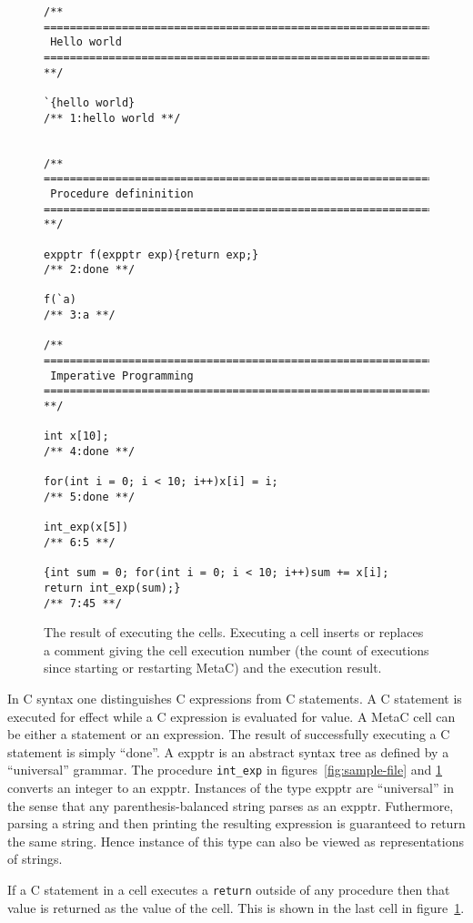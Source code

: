 \documentclass{article}
\begin{document}
\begin{figure}
 \begin{verbatim}
/** ========================================================================
 Hello world
======================================================================== **/

`{hello world}
/** 1:hello world **/


/** ========================================================================
 Procedure defininition
======================================================================== **/

expptr f(expptr exp){return exp;}
/** 2:done **/

f(`a)
/** 3:a **/

/** ========================================================================
 Imperative Programming
======================================================================== **/

int x[10];
/** 4:done **/

for(int i = 0; i < 10; i++)x[i] = i;
/** 5:done **/

int_exp(x[5])
/** 6:5 **/

{int sum = 0; for(int i = 0; i < 10; i++)sum += x[i]; return int_exp(sum);}
/** 7:45 **/
\end{verbatim}
\caption{The result of executing the cells.  Executing a cell inserts or replaces a comment
  giving the cell execution number (the count of executions since starting or restarting MetaC)
  and the execution result.}
\label{fig:execution-results}
\end{figure}

In C syntax one distinguishes C expressions from C statements.  A C
statement is executed for effect while a C expression is evaluated for
value. A MetaC cell can be either a statement or an expression.  The result of successfully
executing a C statement is simply ``done''.
A expptr is an abstract syntax tree as defined by a ``universal'' grammar.
The procedure {\tt int\_exp} in figures~\ref{fig:sample-file} and \ref{fig:execution-results}
converts an integer to an expptr.  Instances of the type expptr are ``universal'' in the sense that any parenthesis-balanced string
parses as an expptr.  Futhermore, parsing a string and then printing the resulting expression is guaranteed to return the same string.
Hence instance of this type can also be viewed as representations of strings.

If a C statement in a cell executes a {\tt return} outside of any
procedure then that value is returned as the value of the cell.
This is shown in the last cell in figure~\ref{fig:execution-results}. 
\end{document}
